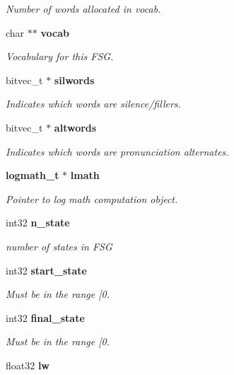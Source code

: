 \begin{CompactItemize}
\begin{CompactList}\small\item\em Number of words allocated in vocab. \item\end{CompactList}\item 
char $\ast$$\ast$ {\bf vocab}
\begin{CompactList}\small\item\em Vocabulary for this FSG. \item\end{CompactList}\item 
bitvec\_\-t $\ast$ {\bf silwords}
\begin{CompactList}\small\item\em Indicates which words are silence/fillers. \item\end{CompactList}\item 
bitvec\_\-t $\ast$ {\bf altwords}
\begin{CompactList}\small\item\em Indicates which words are pronunciation alternates. \item\end{CompactList}\item 
{\bf logmath\_\-t} $\ast$ {\bf lmath}
\begin{CompactList}\small\item\em Pointer to log math computation object. \item\end{CompactList}\item 
int32 {\bf n\_\-state}\label{structfsg__model__s_80cdb0b5e7463221ce14135c9f5a3b01}

\begin{CompactList}\small\item\em number of states in FSG \item\end{CompactList}\item 
int32 {\bf start\_\-state}
\begin{CompactList}\small\item\em Must be in the range [0. \item\end{CompactList}\item 
int32 {\bf final\_\-state}
\begin{CompactList}\small\item\em Must be in the range [0. \item\end{CompactList}\item 
float32 {\bf lw}\label{structfsg__model__s_eaff529953d494b9891dbc0fdac8e97f}


\end{CompactItemize}
